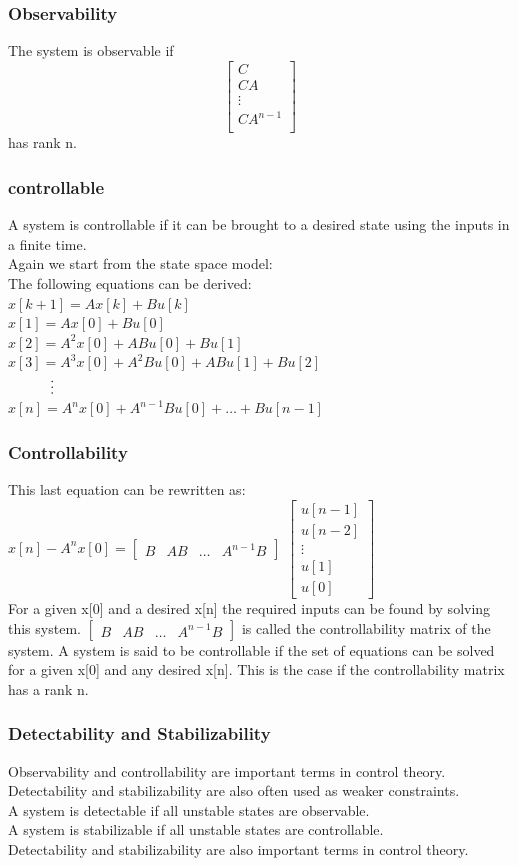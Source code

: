 \begin{frame}
	\frametitle{Observability}
	The system is observable if 
	\[	\begin{bmatrix}
		C\\
		CA\\
		\vdots\\
		CA^{n-1}\\
	\end{bmatrix} \] has rank n.
\end{frame}
\begin{frame}
	\frametitle{controllable}
	A system is controllable if it can be brought to a desired state using the inputs in a finite time.\\
	Again we start from the state space model:\\
	The following equations can be derived:\\
	$x[k+1] = A x[k] +Bu[k]$\\
	$x[1] = Ax[0]+Bu[0]$\\
	$x[2] = A^2 x[0] + ABu[0] + Bu[1]$\\
	$x[3] = A^3 x[0] + A^2Bu[0]+AB u[1] + Bu[2]$\\
	$ \hspace{3 em}\vdots$\\
	$x[n] = A^{n}x[0]+A^{n-1}Bu[0] + \dots + Bu[n-1]$
\end{frame}
\begin{frame}
	\frametitle{Controllability}
	This last equation can be rewritten as:
	$x[n] - A^{n}x[0] = \begin{bmatrix}
	B & AB & \dots & A^{n-1}B
	\end{bmatrix}$ $
	\begin{bmatrix}
	u[n-1]\\
	u[n-2]\\
	\vdots\\
	u[1]\\
	u[0]
	\end{bmatrix}
	 $	\\
	For a given x[0] and a desired x[n] the required inputs can be found by solving this system.
	$\begin{bmatrix}
		B & AB & \dots & A^{n-1}B
	\end{bmatrix}$ is called the controllability matrix of the system.
	A system is said to be controllable if the set of equations can be solved for a given x[0] and any desired x[n].
	This is the case if the controllability matrix has a rank n.
	
\end{frame}
\begin{frame}
	\frametitle{Detectability and Stabilizability}
	Observability and controllability are important terms in control theory.\\
	Detectability and stabilizability are also often used as weaker constraints.\\
	A system is detectable if all unstable states are observable.\\
	A system is stabilizable if all unstable states are controllable.\\
	Detectability and stabilizability are also important terms in control theory.\\
\end{frame}
